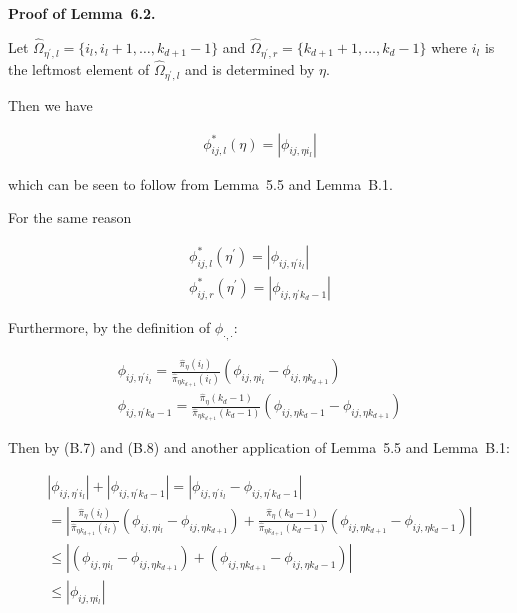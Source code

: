 \par\medskip\noindent\textbf{Proof of Lemma 6.2.}\par



Let $\hat{\Omega}_{\eta^{\prime},l}=\{i_{l},i_{l}+1,\dots,k_{d+1}-1\}$ and $\hat{\Omega}_{\eta^{\prime},r}=\{k_{d+1}+1,\dots,k_{d}-1\}$ where $i_{l}$ is the leftmost element of $\hat{\Omega}_{\eta^{\prime},l}$ and is determined by $\eta$.\par




Then we have\par


\[\begin{gathered}
\phi_{ij,l}^{*}(\eta)=|\phi_{ij,\eta i_{l}}|
\end{gathered}\]


which can be seen to follow from Lemma 5.5 and Lemma B.1.\par




For the same reason\par


\[\begin{gathered}
\displaystyle\phi_{ij,l}^{*}(\eta^{\prime}) \displaystyle=|\phi_{ij,\eta^{\prime}i_{l}}| \\
\displaystyle\phi_{ij,r}^{*}(\eta^{\prime}) \displaystyle=|\phi_{ij,\eta^{\prime}k_{d}-1}|
\end{gathered}\]




Furthermore, by the definition of $\phi_{\cdot,\cdot}$:\par


\[\begin{gathered}
\displaystyle\phi_{ij,\eta^{\prime}i_{l}} \displaystyle=\frac{\hat{\pi}_{\eta}(i_{l})}{\hat{\pi}_{\eta k_{d+1}}(i_{l})}(\phi_{ij,\eta i_{l}}-\phi_{ij,\eta k_{d+1}}) \\
\displaystyle\phi_{ij,\eta^{\prime}k_{d}-1} \displaystyle=\frac{\hat{\pi}_{\eta}(k_{d}-1)}{\hat{\pi}_{\eta k_{d+1}}(k_{d}-1)}(\phi_{ij,\eta k_{d}-1}-\phi_{ij,\eta k_{d+1}})
\end{gathered}\]




Then by (B.7) and (B.8) and another application of Lemma 5.5 and Lemma B.1:\par


\[\begin{gathered}
\displaystyle|\phi_{ij,\eta^{\prime}i_{l}}|+|\phi_{ij,\eta^{\prime}k_{d}-1}| \displaystyle=|\phi_{ij,\eta^{\prime}i_{l}}-\phi_{ij,\eta^{\prime}k_{d}-1}| \\
\displaystyle=\left|\frac{\hat{\pi}_{\eta}(i_{l})}{\hat{\pi}_{\eta k_{d+1}}(i_{l})}(\phi_{ij,\eta i_{l}}-\phi_{ij,\eta k_{d+1}})+\frac{\hat{\pi}_{\eta}(k_{d}-1)}{\hat{\pi}_{\eta k_{d+1}}(k_{d}-1)}(\phi_{ij,\eta k_{d+1}}-\phi_{ij,\eta k_{d}-1})\right| \\
\displaystyle\leq\left|(\phi_{ij,\eta i_{l}}-\phi_{ij,\eta k_{d+1}})+(\phi_{ij,\eta k_{d+1}}-\phi_{ij,\eta k_{d}-1})\right| \\
\displaystyle\leq|\phi_{ij,\eta i_{l}}|
\end{gathered}\]


